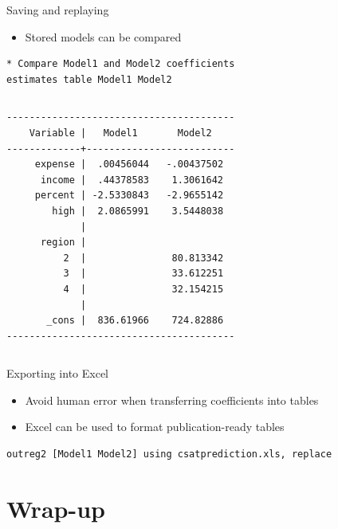 \documentclass[table,smaller]{beamer}
\begin{document}
\begin{frame}[fragile,label=sec-5-4]{Saving and replaying}
 \begin{itemize}
\item Stored models can be compared
\end{itemize}


\begin{verbatim}
* Compare Model1 and Model2 coefficients
estimates table Model1 Model2
\end{verbatim}


\vspace{-.5em}
\begin{columns}
\begin{block}{}
\begin{verbatim}
----------------------------------------
    Variable |   Model1       Model2    
-------------+--------------------------
     expense |  .00456044   -.00437502  
      income |  .44378583    1.3061642  
     percent | -2.5330843   -2.9655142  
        high |  2.0865991    3.5448038  
             |
      region |
          2  |               80.813342  
          3  |               33.612251  
          4  |               32.154215  
             |
       _cons |  836.61966    724.82886  
----------------------------------------
\end{verbatim}
\end{block}
\end{columns}
\vspace{.5em}
\end{frame}


\begin{frame}[fragile,label=sec-5-5]{Exporting into Excel}
 \begin{itemize}
\item Avoid human error when transferring coefficients into tables
\item Excel can be used to format publication-ready tables
\end{itemize}


\begin{verbatim}
outreg2 [Model1 Model2] using csatprediction.xls, replace
\end{verbatim}
\end{frame}


\section{Wrap-up}
\label{sec-6}
\end{document}
